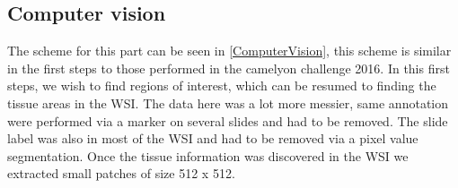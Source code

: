 \documentclass[a4paper,10pt]{article}
\begin{document}
\subsection{Computer vision}

The scheme for this part can be seen in \ref{ComputerVision}, this scheme is similar in the first steps to those performed in the camelyon challenge 2016. In this first steps, we wish to find regions of interest, which can be resumed to finding the tissue areas in the WSI. The data here was a lot more messier, same annotation were performed via a marker on several slides and had to be removed. The slide label was also in most of the WSI and had to be removed via a pixel value segmentation. Once the tissue information was discovered in the WSI we extracted small patches of size 512 x 512.
\end{document}
